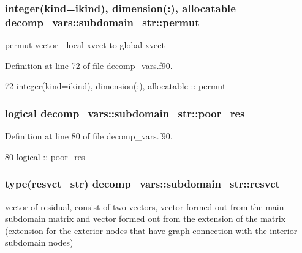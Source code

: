 \subsubsection[{permut}]{\setlength{\rightskip}{0pt plus 5cm}integer(kind=ikind), dimension(\+:), allocatable decomp\+\_\+vars\+::subdomain\+\_\+str\+::permut}\label{structdecomp__vars_1_1subdomain__str_a474ad2b3f43a966bd144914df85edb4a}


permut vector -\/ local xvect to global xvect 



Definition at line 72 of file decomp\+\_\+vars.\+f90.


\begin{DoxyCode}
72     \textcolor{keywordtype}{integer(kind=ikind)}, \textcolor{keywordtype}{dimension(:)}, \textcolor{keywordtype}{allocatable} :: permut
\end{DoxyCode}
\subsubsection[{poor\+\_\+res}]{\setlength{\rightskip}{0pt plus 5cm}logical decomp\+\_\+vars\+::subdomain\+\_\+str\+::poor\+\_\+res}\label{structdecomp__vars_1_1subdomain__str_a49321c1b62d4eccfad1cef6e78fcd6bf}


Definition at line 80 of file decomp\+\_\+vars.\+f90.


\begin{DoxyCode}
80     \textcolor{keywordtype}{logical} :: poor\_res
\end{DoxyCode}
\subsubsection[{resvct}]{\setlength{\rightskip}{0pt plus 5cm}type({\bf resvct\+\_\+str}) decomp\+\_\+vars\+::subdomain\+\_\+str\+::resvct}\label{structdecomp__vars_1_1subdomain__str_a776e24eef13baf9d310b14159dc8e12e}


vector of residual, consist of two vectors, vector formed out from the main subdomain matrix and vector formed out from the extension of the matrix (extension for the exterior nodes that have graph connection with the interior subdomain nodes) 



